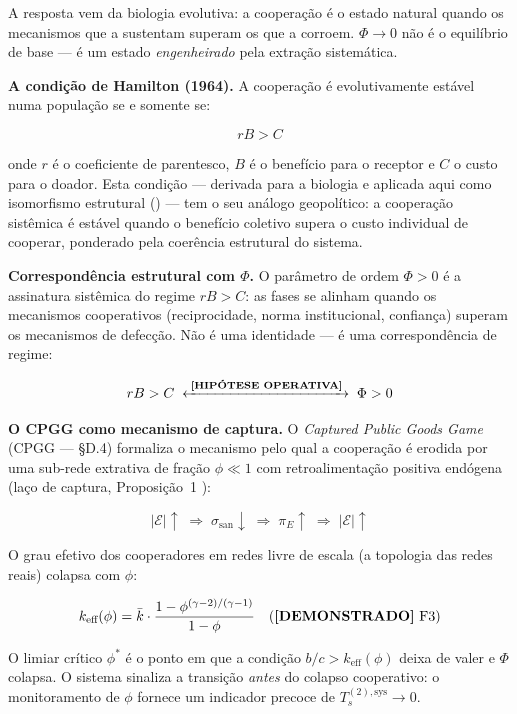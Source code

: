 A resposta vem da biologia evolutiva: a coopera\c{c}\~{a}o \'{e} o
estado natural quando os mecanismos que a sustentam superam os que a
corroem. \(\Phi \to 0\) n\~{a}o \'{e} o equil\'{i}brio de base ---
\'{e} um estado \emph{engenheirado} pela extra\c{c}\~{a}o sistem\'{a}tica.

\Proved{} \textbf{A condi\c{c}\~{a}o de Hamilton (1964).} A
coopera\c{c}\~{a}o \'{e} evolutivamente est\'{a}vel numa popula\c{c}\~{a}o
se e somente se:

\[
rB > C \tag{H}
\]

onde \(r\) \'{e} o coeficiente de parentesco, \(B\) \'{e} o benef\'{i}cio
para o receptor e \(C\) o custo para o doador. Esta condi\c{c}\~{a}o ---
derivada para a biologia e aplicada aqui como isomorfismo estrutural
(\Hypoth{}) --- tem o seu an\'{a}logo geopo\-l\'{i}tico: a
coopera\c{c}\~{a}o sist\^{e}mica \'{e} est\'{a}vel quando o benef\'{i}cio
coletivo supera o custo individual de cooperar, ponderado pela coer\^{e}ncia
estrutural do sistema.

\Hypoth{} \textbf{Correspond\^{e}ncia estrutural com \(\Phi\).}
O par\^{a}metro de ordem \(\Phi > 0\) \'{e} a assinatura sist\^{e}mica do
regime \(rB > C\): as fases se alinham quando os mecanismos cooperativos
(reciprocidade, norma institucional, confian\c{c}a) superam os mecanismos
de defec\c{c}\~{a}o. N\~{a}o \'{e} uma identidade --- \'{e} uma
correspond\^{e}ncia de regime:

\[
rB > C \;\xleftrightarrow{\;\text{\textnormal{\textbf{[HIP\'{O}TESE OPERATIVA]}}{}}\;}\; \Phi > 0
\]

\Hypoth{} \textbf{O CPGG como mecanismo de captura.} O
\textit{Captured Public Goods Game} (CPGG --- §D.4) formaliza o mecanismo
pelo qual a coopera\c{c}\~{a}o \'{e} erodida por uma sub-rede extrativa de
fra\c{c}\~{a}o \(\phi \ll 1\) com retroalimenta\c{c}\~{a}o positiva
end\'{o}gena (la\c{c}o de captura, Proposi\c{c}\~{a}o~1 \Proved{}):

\[
|\mathcal{E}| \uparrow \;\Rightarrow\; \sigma_{\text{san}} \downarrow \;\Rightarrow\; \pi_E \uparrow \;\Rightarrow\; |\mathcal{E}| \uparrow
\]

O grau efetivo dos cooperadores em redes livre de escala (a topologia
das redes reais) colapsa com \(\phi\):

\[
k_{\text{eff}}(\phi) = \bar{k} \cdot \frac{1 - \phi^{(\gamma-2)/(\gamma-1)}}{1-\phi} \quad (\text{\textnormal{\textbf{[DEMONSTRADO]}}{} F3})
\]

O limiar cr\'{i}tico \(\phi^*\) \'{e} o ponto em que a condi\c{c}\~{a}o
\(b/c > k_{\text{eff}}(\phi)\) deixa de valer e \(\Phi\) colapsa.
O sistema sinaliza a transi\c{c}\~{a}o \emph{antes} do colapso
cooperativo: o monitoramento de \(\phi\) fornece um indicador precoce
de \(T_s^{(2),\text{sys}} \to 0\).

